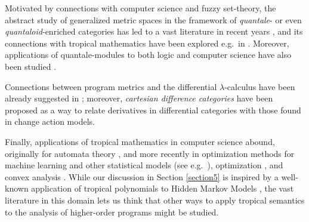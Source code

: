 Motivated by connections with computer science and fuzzy set-theory, 
the abstract study of generalized metric spaces in the framework of \emph{quantale}- or even \emph{quantaloid}-enriched categories has led to a vast literature in recent years \cite{Hofmann2014, Stubbe2014}, 
and its connections with tropical mathematics have been explored e.g.~in \cite{Fuji, Willerton2013}. Moreover, applications of quantale-modules to both logic and computer science have also been studied \cite{Abramsky1993b, Russo2007}.

Connections between program metrics and the differential $\lambda$-calculus have been already suggested in \cite{PistoneLICS}; moreover, \emph{cartesian difference categories} \cite{Picallo2020} have been proposed as a way to relate derivatives in differential categories with those found in change action models.



Finally, applications of tropical mathematics in computer science abound, originally for automata theory \cite{Chua1992, Simon}, and more recently
 in optimization methods for machine learning and other statistical models (see e.g.~\cite{Maragos2021, Pachter2004, Zhang2018}), optimization \cite{Akian2011, Akian2012}, and convex analysis \cite{Lucet2009}. While our discussion in Section \ref{section5} is inspired by a well-known application of tropical polynomials to Hidden Markov Models \cite{Pachter2004},  
the vast literature in this domain lets us think that other ways to 
apply tropical semantics to the analysis of higher-order programs might be studied.

%
%
%
 










